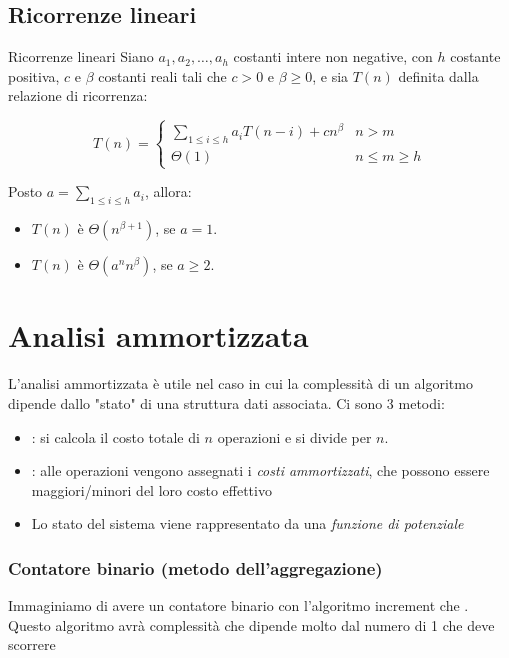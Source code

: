 \subsection{Ricorrenze lineari}
\begin{definizione}{Ricorrenze lineari}
	Siano $a_1, a_2, \dots, a_h$ costanti intere non negative, con $h$ costante positiva, $c$ e $\beta$ costanti reali tali che $c > 0$ e $\beta \geq 0$, e sia $T(n)$ definita dalla relazione di ricorrenza:

	\[
		T(n) =
		\begin{cases}
			\sum_{1 \leq i \leq h} a_i T(n - i) + c n^\beta & n > m           \\
			\Theta(1)                                       & n \leq m \geq h
		\end{cases}
	\]

	Posto $a = \sum_{1 \leq i \leq h} a_i$, allora:

	\begin{itemize}
		\item \quad $T(n)$ è $\Theta(n^{\beta+1})$, se $a = 1$.
		\item \quad $T(n)$ è $\Theta(a^n n^\beta)$, se $a \geq 2$.
	\end{itemize}
	\vskip3mm
\end{definizione}

\section{Analisi ammortizzata}
L'analisi ammortizzata è utile nel caso in cui la complessità di un algoritmo dipende dallo "stato" di una struttura dati associata. Ci sono 3 metodi:
\begin{itemize}
	\item {}: si calcola il costo totale di $ n $ operazioni e si divide per $ n $.
	\item {}: alle operazioni vengono assegnati i \textit{costi ammortizzati}, che possono essere maggiori/minori del loro costo effettivo
	\item {} Lo stato del sistema viene rappresentato da una \textit{funzione di potenziale}
\end{itemize}

\subsubsection{Contatore binario (metodo dell'aggregazione)}
Immaginiamo di avere un contatore binario con l'algoritmo  {\ttfamily increment} che . Questo algoritmo avrà complessità che dipende molto dal numero di 1 che deve scorrere



